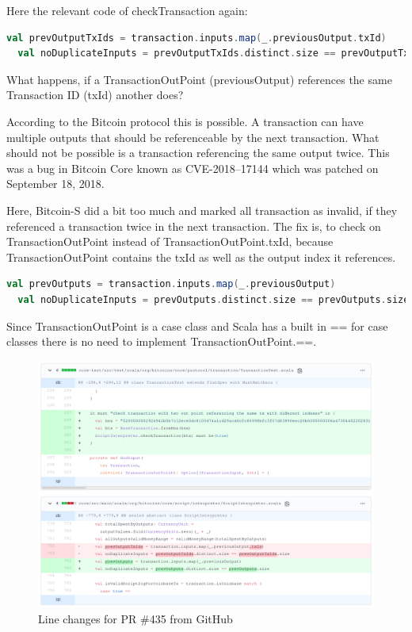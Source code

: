 Here the relevant code of checkTransaction again:
\begin{lstlisting}[language=scala]
  val prevOutputTxIds = transaction.inputs.map(_.previousOutput.txId)
  val noDuplicateInputs = prevOutputTxIds.distinct.size == prevOutputTxIds.size
\end{lstlisting}

What happens, if a TransactionOutPoint (previousOutput) references the same Transaction ID (txId) another does?

According to the Bitcoin protocol this is possible.
A transaction can have multiple outputs that should be referenceable by the next transaction.
What should not be possible is a transaction referencing the same output twice.
This was a bug in Bitcoin Core known as CVE-2018–17144 which was patched on September 18, 2018.

Here, Bitcoin-S did a bit too much and marked all transaction as invalid, if they referenced a transaction twice in the next transaction.
The fix is, to check on TransactionOutPoint instead of TransactionOutPoint.txId, because TransactionOutPoint contains the txId as well as the output index it references.
\begin{lstlisting}[language=scala]
  val prevOutputs = transaction.inputs.map(_.previousOutput)
  val noDuplicateInputs = prevOutputs.distinct.size == prevOutputs.size
\end{lstlisting}
Since TransactionOutPoint is a case class and Scala has a built in == for case classes there is no need to implement TransactionOutPoint.==.
\begin{figure}[H]
	\centering
		\includegraphics[scale=0.396]{images/bitcoin-s-pr.png}
	\caption{Line changes for PR \#435 from GitHub}
	\label{fig:output1}
\end{figure}

